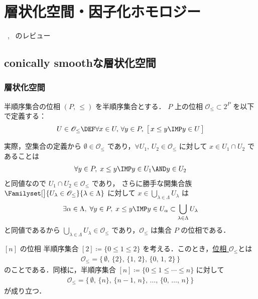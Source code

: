 \documentclass[TQFT_main]{subfiles}
\begin{document}
\chapter{層状化空間・因子化ホモロジー}

~\cite{AFT2014stratified}, ~\cite{AFT2014FH}のレビュー

\section{conically smoothな層状化空間}

\subsection{層状化空間}

\begin{mydef}[label=def:topo-poset]{半順序集合の位相}
    $(P,\, \le)$ を半順序集合とする．
    $P$ 上の位相 $\mathscr{O}_{\le} \subset 2^P$ を以下で定義する：
    \begin{align}
        U \in \mathscr{O}_{\le} \DEF \forall x \in U,\, \forall y \in P,\; \bigl[\, x \le y \IMP y \in U \,\bigr]
    \end{align}
\end{mydef}

実際，空集合の定義から $\emptyset \in \mathscr{O}_{\le}$ であり，$\forall U_1,\, U_2 \in \mathcal{O}_{\le}$ に対して $x \in U_1 \cap U_2$ であることは
\begin{align}
     \forall y \in P,\; x \le y \IMP y \in U_1 \AND y \in U_2
\end{align}
と同値なので $U_1 \cap U_2 \in \mathscr{O}_{\le}$ であり，
さらに勝手な開集合族 $\Familyset[\big]{U_\lambda \in \mathscr{O}_{\le}}{\lambda \in \Lambda}$ に対して
$x \in \bigcup_{\lambda \in \Lambda} U_\lambda$ は
\begin{align}
    \exists \alpha \in \Lambda,\; \forall y \in P,\; x \le y \IMP y \in U_\alpha \subset \bigcup_{\lambda \in \Lambda} U_\lambda 
\end{align}
と同値であるから $\bigcup_{\lambda \in \Lambda} U_\lambda \in \mathscr{O}_{\le}$ であり，$\mathscr{O}_{\le}$ は集合 $P$ の位相である．

\begin{myexample}[label=ex:topo-poset]{{$[n]$} の位相}
    半順序集合 $[2] \coloneqq \{0 \le 1 \le 2\}$ を考える．このとき，\hyperref[def:topo-poset]{位相 $\mathscr{O}_{\le}$}とは
    \begin{align}
        \mathscr{O}_{\le} = \bigl\{\, \emptyset,\, \{2\},\, \{1,\, 2\},\, \{0,\, 1,\, 2\} \,\bigr\} 
    \end{align}
    のことである．同様に，半順序集合 $[n] \coloneqq \{0 \le 1 \le \cdots \le n\}$ に対して
    \begin{align}
        \mathscr{O}_{\le} = \bigl\{\, \emptyset,\, \{n\},\, \{n-1,\, n\},\, \dots,\, \{0,\, \dots,\, n\}  \,\bigr\}
    \end{align}
    が成り立つ．
\end{myexample}
\end{document}
